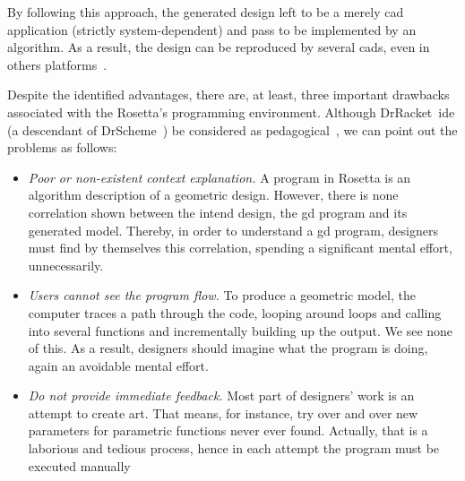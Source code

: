 By following this approach, the generated design left to be a merely \ac{cad} application (strictly system-dependent) and pass to be implemented by an algorithm. As a result, the design can be reproduced by several \ac{cad}s, even in others platforms~\cite{lopes2011portable}.

Despite the identified advantages, there are, at least, three important drawbacks associated with the Rosetta's programming environment. Although DrRacket~\ac{ide} (a descendant of DrScheme~\cite{findler2002drscheme}) be considered as pedagogical~\cite{findler2002drscheme}, we can point out the problems as follows:

\begin{itemize}
 \item \textit{Poor or non-existent context explanation.} A program in Rosetta is an algorithm description of a geometric design. However, there is none correlation shown between the intend design, the \ac{gd} program and its generated model. Thereby, in order to understand a \ac{gd} program, designers must find by themselves this correlation, spending a significant mental effort, unnecessarily. 
 
 \item \textit{Users cannot see the program flow.} To produce a geometric model, the computer traces a path through the code, looping around loops and calling into several functions and incrementally building up the output. We see none of this. As a result, designers should imagine what the program is doing, again an avoidable mental effort.
 
 \item \textit{Do not provide immediate feedback.} Most part of designers' work is an attempt to create art. That means, for instance, try over and over new parameters for parametric functions never ever found. Actually, that is a laborious and tedious process, hence in each attempt the program must be executed manually
\end{itemize}





